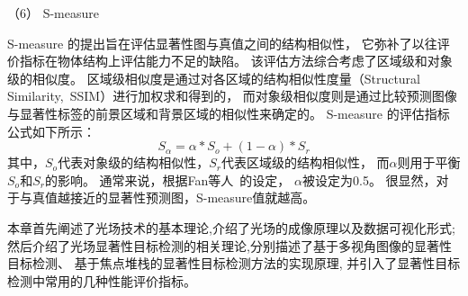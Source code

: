 （6）
S-measure\par
%
%
%
S-measure 的提出旨在评估显著性图与真值之间的结构相似性，
它弥补了以往评价指标在物体结构上评估能力不足的缺陷。
该评估方法综合考虑了区域级和对象级的相似度。
区域级相似度是通过对各区域的结构相似性度量（Structural Similarity,~SSIM）进行加权求和得到的，
而对象级相似度则是通过比较预测图像与显著性标签的前景区域和背景区域的相似性来确定的。
S-measure 的评估指标公式如下所示：
\begin{equation}
	S_{\alpha} = \alpha * S_{o} + \left ( 1 - \alpha  \right )*S_{r} 
\end{equation}
%
%
其中，$S_{o}$代表对象级的结构相似性，$S_{r}$代表区域级的结构相似性，
而$\alpha$则用于平衡$S_{o}$和$S_{r}$的影响。
通常来说，根据Fan等人~的设定，
$\alpha$被设定为0.5。
很显然，对于与真值越接近的显著性预测图，S-measure值就越高。
%
%





本章首先阐述了光场技术的基本理论,介绍了光场的成像原理以及数据可视化形式;
然后介绍了光场显著性目标检测的相关理论,分别描述了基于多视角图像的显著性目标检测、
基于焦点堆栈的显著性目标检测方法的实现原理,
并引入了显著性目标检测中常用的几种性能评价指标。
